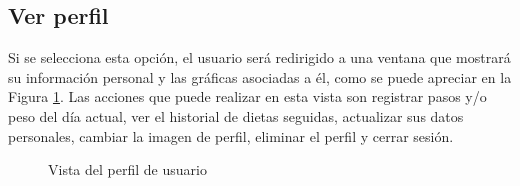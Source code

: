 \subsection{Ver perfil}
Si se selecciona esta opción, el usuario será redirigido a una ventana que mostrará su información personal y las gráficas asociadas a él, como se puede apreciar en la Figura \ref{fig:user_profile}. Las acciones que puede realizar en esta vista son registrar pasos y/o peso del día actual, ver el historial de dietas seguidas, actualizar sus datos personales, cambiar la imagen de perfil, eliminar el perfil y cerrar sesión.

\begin{figure}[H]
    \centering
    \caption{Vista del perfil de usuario}
    \label{fig:user_profile}
\end{figure}

